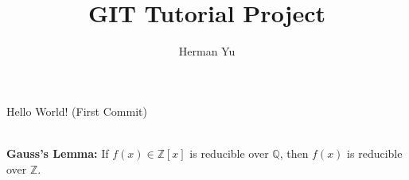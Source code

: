 \documentclass[12pt]{article}
\begin{document}
\title{GIT Tutorial Project}
\date{}
\author{Herman Yu}
\maketitle

Hello World! (First Commit)\par 
\hfill \\
\textbf{Gauss's Lemma:} If $f(x)\in \mathbb{Z}[x]$ is reducible over $\mathbb{Q}$, then $f(x)$ is reducible over $\mathbb{Z}$.
\end{document}
